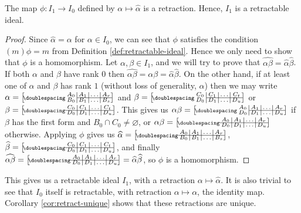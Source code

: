\begin{proposition}
  \label{prop:hat-retraction}
  The map $\phi: I_1 \to I_0$ defined by $\alpha \mapsto \widehat\alpha$ is a
  retraction.  Hence, $I_1$ is a retractable ideal.
  \begin{proof}
    Since $\widehat\alpha = \alpha$ for $\alpha \in I_0$, we can see that $\phi$
    satisfies the condition $(m)\phi = m$ from Definition
    \ref{def:retractable-ideal}.  Hence we only need to show that $\phi$ is a
    homomorphism. Let
    $\alpha,\beta \in I_1$, and we will try to prove that
    $\widehat{\alpha\beta} = \widehat\alpha \widehat\beta$.  If both $\alpha$
    and $\beta$ have rank $0$ then
    $\widehat{\alpha\beta} = \alpha\beta = \widehat\alpha \widehat\beta$.  On
    the other hand, if at least one of $\alpha$ and $\beta$ has rank $1$ (without
    loss of generality, $\alpha$) then we may write
    $\alpha = \bipart{c|c|c|c}{2-4}{A_0&A_1&\ldots&A_r}{B_0&B_1&\ldots&B_s}$ and
    $\beta = \bipart{c|c|c|c}{2-4}{C_0&C_1&\ldots&C_t}{D_0&D_1&\ldots&D_u}$ or
    $\beta = \bipart{c|c|c|c}{1-4}{C_0&C_1&\ldots&C_t}{D_0&D_1&\ldots&D_u}$.
    This gives us
    $\alpha\beta =
    \bipart{c|c|c|c}{2-4}{A_0&A_1&\ldots&A_r}{D_0&D_1&\ldots&D_u}$
    if $\beta$ has the first form and $B_0 \cap C_0 \neq \varnothing$, or
    $\alpha\beta =
    \bipart{c|c|c|c}{1-4}{A_0&A_1&\ldots&A_r}{D_0&D_1&\ldots&D_u}$ otherwise.  Applying
    $\phi$ gives us
    $\widehat\alpha =
    \bipart{c|c|c|c}{1-4}{A_0&A_1&\ldots&A_r}{B_0&B_1&\ldots&B_s}$,
    $\widehat\beta =
    \bipart{c|c|c|c}{1-4}{C_0&C_1&\ldots&C_t}{D_0&D_1&\ldots&D_u}$, and finally
    $\widehat{\alpha\beta} =
    \bipart{c|c|c|c}{1-4}{A_0&A_1&\ldots&A_r}{D_0&D_1&\ldots&D_u} =
    \widehat\alpha \widehat\beta$, so $\phi$ is a homomorphism.
  \end{proof}
\end{proposition}

This gives us a retractable ideal $I_1$, with a retraction
$\alpha \mapsto \widehat\alpha$.  It is also trivial to see that $I_0$ itself is
retractable, with retraction $\alpha \mapsto \alpha$, the identity map.
Corollary \ref{cor:retract-unique} shows
that these retractions are unique.

